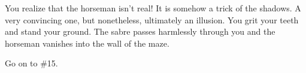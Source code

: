 \documentclass[white]{gl2018}
\begin{document}
\begin{large}
\begin{location}{44}
You realize that the horseman isn't real! It is somehow a trick of the shadows. A very convincing one, but nonetheless, ultimately an illusion. You grit your teeth and stand your ground. The sabre passes harmlessly through you and the horseman vanishes into the wall of the maze. 
\begin{fromhere} Go on to \#15.\end{fromhere}
\end{location}
\end{large}
\end{document}
